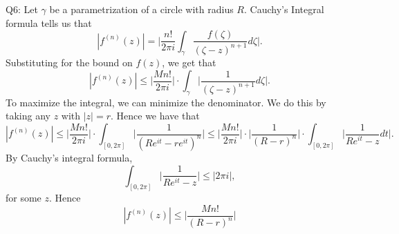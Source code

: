\documentclass[letterpaper]{article}
\begin{document}
\noindent Q6: Let $\gamma$ be a parametrization of a circle with radius $R$. Cauchy's Integral formula tells us that $$|f^{(n)}(z) | = \Big| \frac{n!}{2\pi i} \int_\gamma \frac{f(\zeta)}{(\zeta - z)^{n+1}} d\zeta \Big|. $$
Substituting for the bound on $f(z)$, we get that $$|f^{(n)}(z) | \leq \Big| \frac{Mn!}{2\pi i}\Big| \cdot  \int_\gamma \Big| \frac{1}{(\zeta - z)^{n+1}} d\zeta \Big| . $$
To maximize the integral, we can minimize the denominator. We do this by taking any $z$ with $|z| = r$. 
Hence we have that $$|f^{(n)}(z) | \leq \Big| \frac{M n!}{2\pi i} \Big| \cdot \int_{[0, 2\pi]} \Big| \frac{1}{(Re^{it} - re^{it})^n} \Big| \leq \Big| \frac{M n!}{2\pi i} \Big| \cdot \Big| \frac{1}{(R-r)^n} \Big| \cdot  \int_{[0, 2\pi]} \Big| \frac{1}{Re^{it} - z} dt \Big|. $$
By Cauchy's integral formula, $$ \int_{[0,2\pi]} \Big| \frac{1}{Re^{it} - z} \Big| \leq |2\pi i|,$$ for some $z$. Hence $$|f^{(n)}(z)| \leq \Big| \frac{Mn!}{(R-r)^n} \Big|$$  
\end{document}
